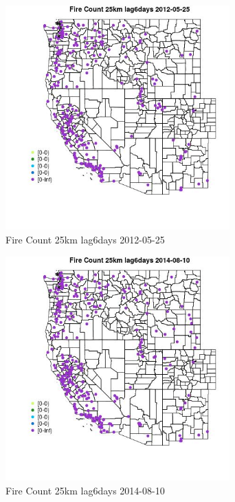 \begin{figure} 
\centering  
\includegraphics[width=0.77\textwidth]{Code_Outputs/Report_ML_input_PM25_Step4_part_e_de_duplicated_aves_compiled_2019-05-18wNAs_MapObsFire_Count_25km_lag6days2012-05-25.jpg} 
\caption{\label{fig:Report_ML_input_PM25_Step4_part_e_de_duplicated_aves_compiled_2019-05-18wNAsMapObsFire_Count_25km_lag6days2012-05-25}Fire Count 25km lag6days 2012-05-25} 
\end{figure} 
 

\begin{figure} 
\centering  
\includegraphics[width=0.77\textwidth]{Code_Outputs/Report_ML_input_PM25_Step4_part_e_de_duplicated_aves_compiled_2019-05-18wNAs_MapObsFire_Count_25km_lag6days2014-08-10.jpg} 
\caption{\label{fig:Report_ML_input_PM25_Step4_part_e_de_duplicated_aves_compiled_2019-05-18wNAsMapObsFire_Count_25km_lag6days2014-08-10}Fire Count 25km lag6days 2014-08-10} 
\end{figure} 
 

